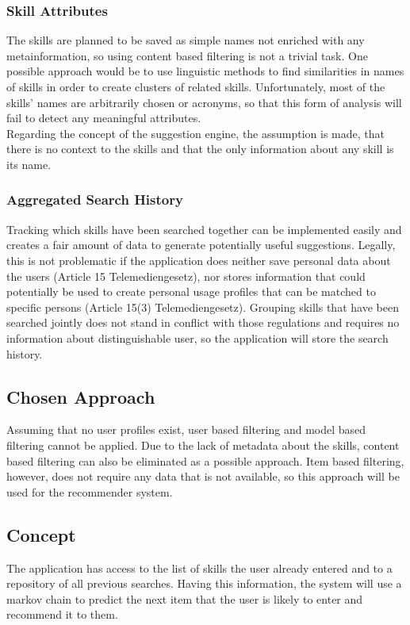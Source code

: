 \newpage
\subsubsection{Skill Attributes}
The skills are planned to be saved as simple names not enriched with any metainformation, so using content based filtering is not a trivial task. One possible approach would be to use linguistic methods to find similarities in names of skills in order to create clusters of related skills. Unfortunately, most of the skills' names are arbitrarily chosen or acronyms, so that this form of analysis will fail to detect any meaningful attributes.\\
Regarding the concept of the suggestion engine, the assumption is made, that there is no context to the skills and that the only information about any skill is its name.

\subsubsection{Aggregated Search History}
Tracking which skills have been searched together can be implemented easily and creates a fair amount of data to generate potentially useful suggestions. Legally, this is not problematic if the application does neither save personal data about the users (Article 15 Telemediengesetz), nor stores information that could potentially be used to create personal usage profiles that can be matched to specific persons (Article 15(3) Telemediengesetz). Grouping skills that have been searched jointly does not stand in conflict with those regulations and requires no information about distinguishable user, so the application will store the search history.

\subsection{Chosen Approach}
Assuming that no user profiles exist, user based filtering and model based filtering cannot be applied. Due to the lack of metadata about the skills, content based filtering can also be eliminated as a possible approach. Item based filtering, however, does not require any data that is not available, so this approach will be used for the recommender system.

\subsection{Concept}
The application has access to the list of skills the user already entered and to a repository of all previous searches. Having this information, the system will use a markov chain to predict the next item that the user is likely to enter and recommend it to them.

